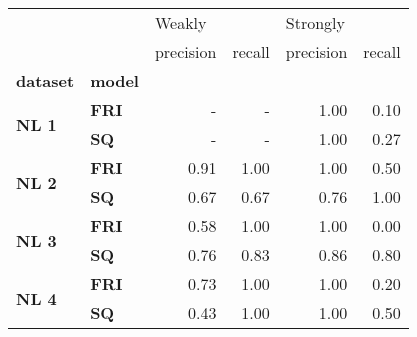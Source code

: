 \begin{tabular}{llrrrr}
\toprule
     &    & \multicolumn{2}{l}{Weakly} & \multicolumn{2}{l}{Strongly} \\
     &    & precision & recall & precision & recall \\
\textbf{dataset} & \textbf{model} &           &        &           &        \\
\midrule
\multirow{2}{*}{\textbf{NL 1}} & \textbf{FRI} &         - &      - &      1.00 &   0.10 \\
     & \textbf{SQ} &         - &      - &      1.00 &   0.27 \\
\cline{1-6}
\multirow{2}{*}{\textbf{NL 2}} & \textbf{FRI} &      0.91 &   1.00 &      1.00 &   0.50 \\
     & \textbf{SQ} &      0.67 &   0.67 &      0.76 &   1.00 \\
\cline{1-6}
\multirow{2}{*}{\textbf{NL 3}} & \textbf{FRI} &      0.58 &   1.00 &      1.00 &   0.00 \\
     & \textbf{SQ} &      0.76 &   0.83 &      0.86 &   0.80 \\
\cline{1-6}
\multirow{2}{*}{\textbf{NL 4}} & \textbf{FRI} &      0.73 &   1.00 &      1.00 &   0.20 \\
     & \textbf{SQ} &      0.43 &   1.00 &      1.00 &   0.50 \\
\bottomrule
\end{tabular}
